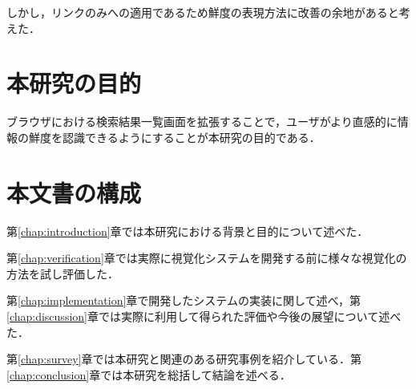 しかし，リンクのみへの適用であるため鮮度の表現方法に改善の余地があると考えた．

\section{本研究の目的}

ブラウザにおける検索結果一覧画面を拡張することで，ユーザがより直感的に情報の鮮度を認識できるようにすることが本研究の目的である．

\section{本文書の構成}

第\ref{chap:introduction}章では本研究における背景と目的について述べた．

第\ref{chap:verification}章では実際に視覚化システムを開発する前に様々な視覚化の方法を試し評価した．

第\ref{chap:implementation}章で開発したシステムの実装に関して述べ，第\ref{chap:discussion}章では実際に利用して得られた評価や今後の展望について述べた．

第\ref{chap:survey}章では本研究と関連のある研究事例を紹介している．第\ref{chap:conclusion}章では本研究を総括して結論を述べる．
